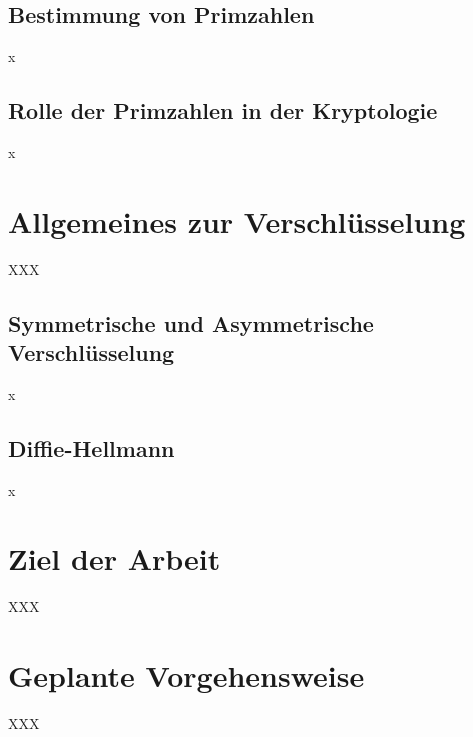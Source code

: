 \subsection{Bestimmung von Primzahlen}
x

\subsection{Rolle der Primzahlen in der Kryptologie}
x

\section{Allgemeines zur Verschlüsselung}
XXX

\subsection{Symmetrische und Asymmetrische Verschlüsselung}
x

\subsection{Diffie-Hellmann}
x

\section{Ziel der Arbeit}
XXX

\section{Geplante Vorgehensweise}
XXX